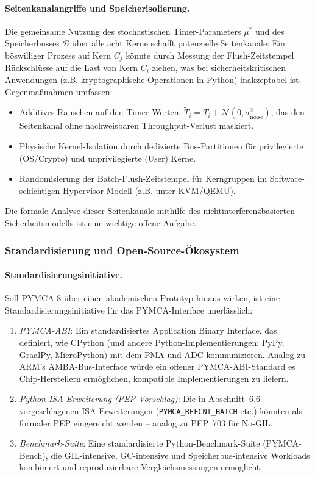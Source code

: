 ﻿\documentclass[a4paper,12pt]{scrreprt}
\theoremstyle{definition}
\begin{document}
	\paragraph{Seitenkanalangriffe und Speicherisolierung.}
	Die gemeinsame Nutzung des stochastischen Timer-Parameters $\mu^*$ und des
	Speicherbusses $\mathcal{B}$ über alle acht Kerne schafft potenzielle
	Seitenkanäle: Ein böswilliger Prozess auf Kern $C_j$ könnte durch Messung
	der Flush-Zeitstempel Rückschlüsse auf die Last von Kern $C_i$ ziehen,
	was bei sicherheitskritischen Anwendungen (z.B. kryptographische Operationen
	in Python) inakzeptabel ist. Gegenmaßnahmen umfassen:
	\begin{itemize}[noitemsep]
		\item Additives Rauschen auf den Timer-Werten: $\tilde{T}_i = T_i + \mathcal{N}(0, \sigma_{\mathrm{noise}}^2)$,
		das den Seitenkanal ohne nachweisbaren Throughput-Verlust maskiert.
		\item Physische Kernel-Isolation durch dedizierte Bus-Partitionen für
		privilegierte (OS/Crypto) und unprivilegierte (User) Kerne.
		\item Randomisierung der Batch-Flush-Zeitstempel für Kerngruppen im
		Software-schichti\-gen Hypervisor-Modell (z.B. unter KVM/QEMU).
	\end{itemize}
	Die formale Analyse dieser Seitenkanäle mithilfe des nichtinterferenzbasierten
	Sicherheitsmodells \cite{sleator1985amortized} ist eine wichtige offene Aufgabe.

	\subsubsection{Standardisierung und Open-Source-Ökosystem}

	\paragraph{Standardisierungsinitiative.}
	Soll PYMCA-8 über einen akademischen Prototyp hinaus wirken, ist eine
	Standardisierungsinitiative für das PYMCA-Interface unerlässlich:
	\begin{enumerate}[noitemsep]
		\item \emph{PYMCA-ABI}: Ein standardisiertes Application Binary Interface,
		das definiert, wie CPython (und andere Python-Implementierungen: PyPy,
		GraalPy, MicroPython) mit dem PMA und ADC kommunizieren. Analog zu
		ARM's AMBA-Bus-Interface würde ein offener PYMCA-ABI-Standard es
		Chip-Herstellern ermöglichen, kompatible Implementierungen zu liefern.
		\item \emph{Python-ISA-Erweiterung (PEP-Vorschlag)}: Die in Abschnitt~6.6
		vorgeschlagenen ISA-Erweiterungen (\texttt{PYMCA\_REFCNT\_BATCH} etc.)
		könnten als formaler PEP eingereicht werden -- analog zu PEP~703 für No-GIL.
		\item \emph{Benchmark-Suite}: Eine standardisierte Python-Benchmark-Suite
		(PYMCA-Bench), die GIL-intensive, GC-intensive und Speicherbus-intensive
		Workloads kombiniert und reproduzierbare Vergleichsmessungen ermöglicht.
	\end{enumerate}
\end{document}

